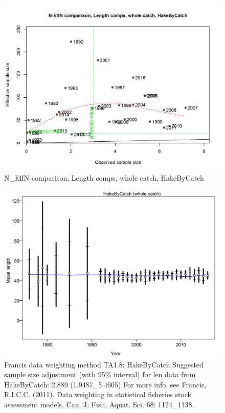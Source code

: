 \documentclass[12pt,]{article}
\begin{document}
\begin{figure}[htbp]
\centering
\includegraphics{./r4ss/plots_mod1/comp_lenfit_sampsize_flt2mkt0.png}
\caption{N\_EffN comparison, Length comps, whole catch, HakeByCatch
\label{fig:mod1_12_comp_lenfit_sampsize_flt2mkt0}}
\end{figure}

\begin{figure}[htbp]
\centering
\includegraphics{./r4ss/plots_mod1/comp_lenfit_data_weighting_TA1.8_HakeByCatch.png}
\caption{Francis data weighting method TA1.8: HakeByCatch Suggested
sample size adjustment (with 95\% interval) for len data from
HakeByCatch: 2.889 (1.9487\_5.4605) For more info, see Francis, R.I.C.C.
(2011). Data weighting in statistical fisheries stock assessment models.
Can. J. Fish. Aquat. Sci. 68: 1124\_1138.
\label{fig:mod1_13_comp_lenfit_data_weighting_TA1.8_HakeByCatch}}
\end{figure}
\end{document}
